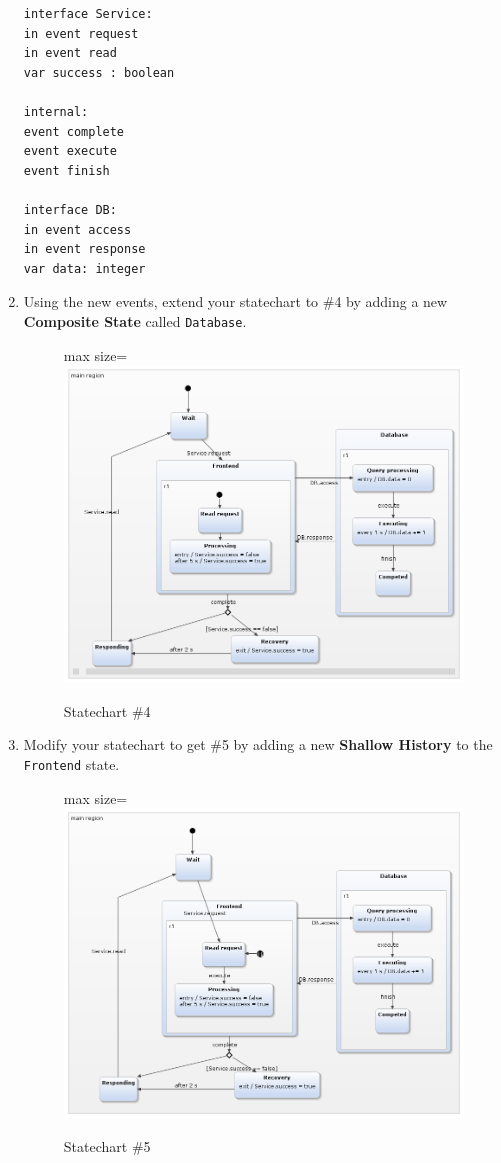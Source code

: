 \documentclass[]{report}
\let\Oldincludegraphics\includegraphics
\renewcommand{\includegraphics}[1]{
\begin{adjustbox}{max size={\textwidth}{\textheight}}
    \Oldincludegraphics[scale=0.6]{#1}%
\end{adjustbox}
}
\begin{document}
\begin{enumerate}
\begin{verbatim}
interface Service:
in event request
in event read
var success : boolean

internal:
event complete
event execute
event finish

interface DB:
in event access
in event response
var data: integer 
\end{verbatim}
\item
  Using the new events, extend your statechart to \#4 by adding a new
  \textbf{Composite State} called \texttt{Database}.

  \begin{figure}[htbp]
  \centering
  \includegraphics{img/yakindu/statechart_4.png}
  \caption{Statechart \#4}
  \end{figure}
\item
  Modify your statechart to get \#5 by adding a new \textbf{Shallow
  History} to the \texttt{Frontend} state.

  \begin{figure}[htbp]
  \centering
  \includegraphics{img/yakindu/statechart_5.png}
  \caption{Statechart \#5}
  \end{figure}
\end{enumerate}
\end{document}
